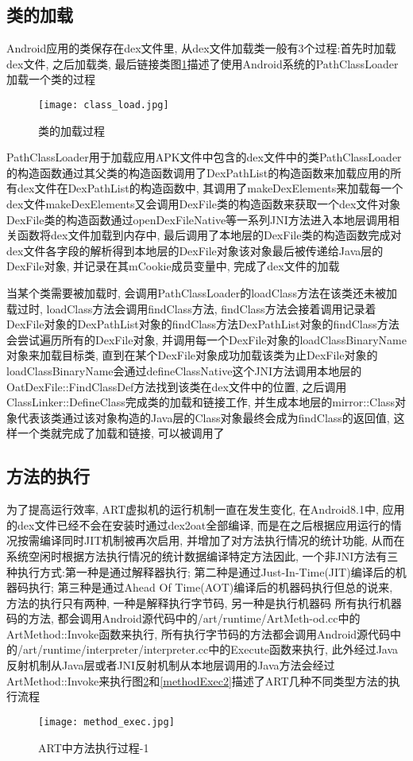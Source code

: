\subsection{类的加载}
\label{classLoadA}
Android应用的类保存在dex文件里, 从dex文件加载类一般有3个过程:首先时加载dex文件, 之后加载类, 最后链接类\juhao 图\ref{classLoad}描述了使用Android系统的PathClassLoader加载一个类的过程\juhao 
\begin{figure}[ht]
	\centering
	\texttt{[image: class\_load.jpg]}
	\caption{类的加载过程}
	\label{classLoad}
\end{figure}
PathClassLoader用于加载应用APK文件中包含的dex文件中的类\juhao PathClassLoader的构造函数通过其父类的构造函数调用了DexPathList的构造函数来加载应用的所有dex文件\juhao 在DexPathList的构造函数中, 其调用了makeDexElements来加载每一个dex文件\juhao makeDexElements又会调用DexFile类的构造函数来获取一个dex文件对象\juhao DexFile类的构造函数通过openDexFileNative等一系列JNI方法进入本地层调用相关函数将dex文件加载到内存中, 最后调用了本地层的DexFile类的构造函数完成对dex文件各字段的解析得到本地层的DexFile对象\juhao 该对象最后被传递给Java层的DexFile对象, 并记录在其mCookie成员变量中, 完成了dex文件的加载\juhao

当某个类需要被加载时, 会调用PathClassLoader的loadClass方法\juhao 在该类还未被加载过时, loadClass方法会调用findClass方法, findClass方法会接着调用记录着DexFile对象的DexPathList对象的findClass方法\juhao DexPathList对象的findClass方法会尝试遍历所有的DexFile对象, 并调用每一个DexFile对象的loadClassBinaryName对象来加载目标类, 直到在某个DexFile对象成功加载该类为止\juhao DexFile对象的loadClassBinaryName会通过defineClassNative这个JNI方法调用本地层的OatDexFile::FindClassDef方法找到该类在dex文件中的位置, 之后调用ClassLinker::DefineClass完成类的加载和链接工作, 并生成本地层的mirror::Class对象代表该类\juhao 通过该对象构造的Java层的Class对象最终会成为findClass的返回值, 这样一个类就完成了加载和链接, 可以被调用了\juhao 

\subsection{方法的执行}
\label{methodExecA}
为了提高运行效率, ART虚拟机的运行机制一直在发生变化, 在Android8.1中, 应用的dex文件已经不会在安装时通过dex2oat全部编译, 而是在之后根据应用运行的情况按需编译\juhao 同时JIT机制被再次启用, 并增加了对方法执行情况的统计功能, 从而在系统空闲时根据方法执行情况的统计数据编译特定方法\juhao 因此, 一个非JNI方法有三种执行方式:第一种是通过解释器执行; 第二种是通过Just-In-Time(JIT)编译后的机器码执行; 第三种是通过Ahead Of Time(AOT)编译后的机器码执行\juhao 但总的说来, 方法的执行只有两种, 一种是解释执行字节码, 另一种是执行机器码\juhao 
所有执行机器码的方法, 都会调用Android源代码中的/art/runtime/ArtMeth-od.cc中的ArtMethod::Invoke函数来执行, 所有执行字节码的方法都会调用Android源代码中的/art/runtime/interpreter/interpreter.cc中的Execute函数来执行, 此外经过Java反射机制从Java层或者JNI反射机制从本地层调用的Java方法会经过ArtMethod::Invoke来执行\juhao 图\ref{methodExec}和\ref{methodExec2}描述了ART几种不同类型方法的执行流程\juhao 
\begin{figure}[]
	\centering
	\texttt{[image: method\_exec.jpg]}
	\caption{ART中方法执行过程-1}
	\label{methodExec}
\end{figure}

